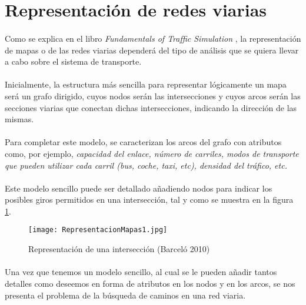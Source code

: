\newpage

\section{Representación de redes viarias}

	\paragraph{}
	Como se explica en el libro \emph{Fundamentals of Traffic Simulation} \cite{Barcelo2010}, la representación de mapas o de las redes viarias dependerá del tipo de análisis que se quiera llevar a cabo sobre el sistema de transporte.
	
	\paragraph{}
	Inicialmente, la estructura más sencilla para representar lógicamente un mapa será un grafo dirigido, cuyos nodos serán las intersecciones y cuyos arcos serán las secciones viarias que conectan dichas intersecciones, indicando la dirección de las mismas.
	
	\paragraph{}
	Para completar este modelo, se caracterizan los arcos del grafo con atributos como, por ejemplo,  \emph{capacidad del enlace, número de carriles, modos de transporte que pueden utilizar cada carril (bus, coche, taxi, etc), densidad del tráfico, etc.}
	
	\paragraph{}
	Este modelo sencillo puede ser detallado añadiendo nodos para indicar los posibles giros permitidos en una intersección, tal y como se muestra en la figura \ref{fig:RepresentacionMapas1}.
	
	\begin{figure}[ht]
		\centering
			\texttt{[image: RepresentacionMapas1.jpg]}
		\caption{Representación de una intersección (Barceló 2010) \cite{Barcelo2010}}
		\label{fig:RepresentacionMapas1}
	\end{figure}	

	\paragraph{}
	Una vez que tenemos un modelo sencillo, al cual se le pueden añadir tantos detalles como deseemos en forma de atributos en los nodos y en los arcos, se nos presenta el problema de la búsqueda de caminos en una red viaria.
	
